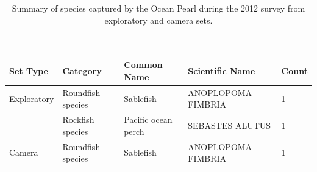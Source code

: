 \documentclass[12pt]{article}\usepackage[]{graphicx}\usepackage[]{color}
\begin{document}
\begin{table}[!h]

\caption{\label{tab:table5}Summary of species captured by the Ocean Pearl during the 2012 survey from exploratory and camera sets.\\
\hspace*{0.333em}\\
\hspace*{0.333em}\\}
\fontsize{9.5}{11.5}\selectfont
\begin{tabular}[t]{lllll}
\toprule
\textbf{Set Type} & \textbf{Category} & \textbf{Common Name} & \textbf{Scientific Name} & \textbf{Count}\\
\midrule
Exploratory & Roundfish species & Sablefish & ANOPLOPOMA FIMBRIA & 1\\
 & Rockfish species & Pacific ocean perch & SEBASTES ALUTUS & 1\\
\midrule
Camera & Roundfish species & Sablefish & ANOPLOPOMA FIMBRIA & 1\\
\bottomrule
\end{tabular}
\end{table}
~\\
\hspace*{0.333em}\\
\end{document}
